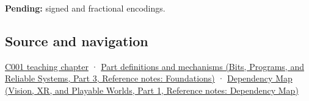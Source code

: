 \textbf{Pending:} signed and fractional encodings.

\subsection{Source and navigation}\label{appendix-83c3f28f7bda-source-and-navigation}

\hypertarget{appendix-83c3f28f7bda-source-and-navigation}{}

\hyperref[01-foundations-i-ch001-from-a-signal-to-an-interpretation]{C001 teaching chapter} · \href{../01-Bits-Programs-and-Reliable-Systems-P03/main.pdf\#nameddest=appendix-fd090d982a15}{Part definitions and mechanisms (Bits, Programs, and Reliable Systems, Part 3, Reference notes: Foundations)} · \href{../07-Vision-XR-and-Playable-Worlds-P01/main.pdf\#nameddest=appendix-4ad47bdd269a}{Dependency Map (Vision, XR, and Playable Worlds, Part 1, Reference notes: Dependency Map)}
